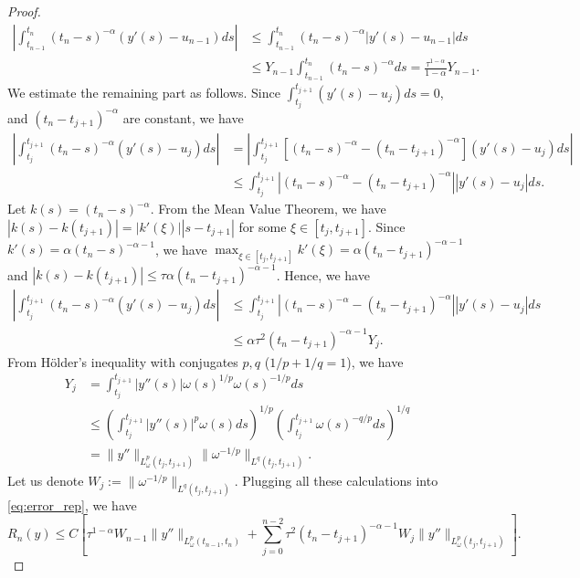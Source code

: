 \documentclass[12pt,a4paper]{article}
\theoremstyle{definition}
\begin{document}
\begin{proof}
\begin{align}
    \left|\int_{t_{n-1}}^{t_{n}} (t_n - s)^{-\alpha} (y'(s) - u_{n-1}) ds\right| &\le \int_{t_{n-1}}^{t_n} (t_n - s)^{-\alpha} |y'(s) - u_{n-1}| ds \nonumber \\
    &\le Y_{n-1} \int_{t_{n-1}}^{t_n} (t_n - s)^{-\alpha} ds = \frac{\tau^{1-\alpha}}{1-\alpha} Y_{n-1}.
\end{align}
We estimate the remaining part as follows. Since $\int_{t_j}^{t_{j+1}} (y'(s) - u_j) ds = 0$, and $(t_n - t_{j+1})^{-\alpha}$ are constant, we have
\begin{align}
    \left|\int_{t_j}^{t_{j+1}} (t_n - s)^{-\alpha} (y'(s) - u_j) ds\right| &= \left|\int_{t_j}^{t_{j+1}} \left[ (t_n - s)^{-\alpha} - (t_n - t_{j+1})^{-\alpha} \right] (y'(s) - u_j) ds \right| \nonumber \\
    &\le \int_{t_j}^{t_{j+1}} |(t_n - s)^{-\alpha} - (t_n - t_{j+1})^{-\alpha}| |y'(s) - u_j| ds.
\end{align}
Let $k(s) = (t_n-s)^{-\alpha}$. From the Mean Value Theorem, we have $|k(s) - k(t_{j+1})| = |k'(\xi)||s-t_{j+1}|$ for some $\xi\in[t_j, t_{j+1}]$. Since $k'(s) = \alpha(t_n-s)^{-\alpha-1}$, we have $\max_{\xi\in[t_j, t_{j+1}]}k'(\xi) = \alpha(t_n-t_{j+1})^{-\alpha-1}$ and $|k(s) - k(t_{j+1})| \leq\tau\alpha(t_n-t_{j+1})^{-\alpha-1}$. Hence, we have
\begin{align}
    \left|\int_{t_j}^{t_{j+1}} (t_n - s)^{-\alpha} (y'(s) - u_j) ds \right| &\le \int_{t_j}^{t_{j+1}} |(t_n - s)^{-\alpha} - (t_n - t_{j+1})^{-\alpha}| |y'(s) - u_j| ds \nonumber \\
    &\le \alpha \tau^2 (t_n - t_{j+1})^{-\alpha-1} Y_j.
\end{align}
From H\"older's inequality with conjugates $p, q$ ($1/p + 1/q = 1$), we have
\begin{align}
    Y_j &= \int_{t_j}^{t_{j+1}} |y''(s)| \omega(s)^{1/p} \omega(s)^{-1/p} ds \nonumber \\
    &\le \left( \int_{t_j}^{t_{j+1}} |y''(s)|^p \omega(s) ds \right)^{1/p} \left( \int_{t_j}^{t_{j+1}} \omega(s)^{-q/p} ds \right)^{1/q} \nonumber \\
    &= \|y''\|_{L^p_\omega(t_j, t_{j+1})} \|\omega^{-1/p}\|_{L^q(t_j, t_{j+1})}.
\end{align}
Let us denote $W_j := \|\omega^{-1/p}\|_{L^q(t_j, t_{j+1})}$. Plugging all these calculations into \eqref{eq:error_rep}, we have
\begin{equation}
    R_n(y) \le C \left[ \tau^{1-\alpha} W_{n-1} \|y''\|_{L^p_\omega(t_{n-1}, t_{n})} + \sum_{j=0}^{n-2} \tau^2 (t_n - t_{j+1})^{-\alpha-1} W_j \|y''\|_{L^p_\omega(t_j, t_{j+1})} \right].

\end{equation}
\end{proof}
\end{document}
